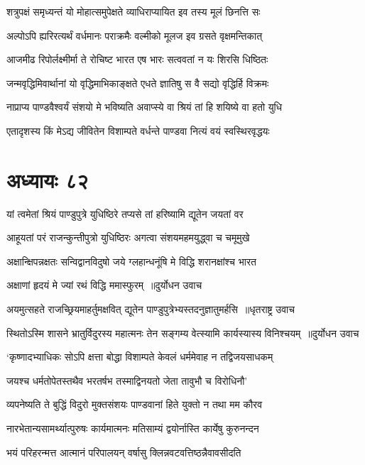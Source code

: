 \twolineshloka
{शत्रुपक्षं समृध्यन्तं यो मोहात्समुपेक्षते}
{व्याधिराप्यायित इव तस्य मूलं छिनत्ति सः}


\twolineshloka
{अल्पोऽपि ह्यरिरत्यर्थं वर्धमानः पराक्रमैः}
{वल्मीको मूलज इव ग्रसते वृक्षमन्तिकात्}


\twolineshloka
{आजमीढ रिपोर्लक्ष्मीर्मा ते रोचिष्ट भारत}
{एष भारः सत्ववतां न यः शिरसि धिष्ठितः}


\twolineshloka
{जन्मवृद्धिमिवार्थानां यो वृद्धिमाभिकाङ्क्षते}
{एधते ज्ञातिषु स वै सद्यो वृद्धिर्हि विक्रमः}


\twolineshloka
{नाप्राप्य पाण्डवैश्वर्यं संशयो मे भविष्यति}
{अवाप्स्ये वा श्रियं तां हि शयिष्ये वा हतो युधि}


\twolineshloka
{एतादृशस्य किं मेऽद्य जीवितेन विशाम्पते}
{वर्धन्ते पाण्डवा नित्यं वयं स्वस्थिरवृद्धयः}


\chapter{अध्यायः ८२}
\twolineshloka
{यां त्वमेतां श्रियं पाण्डुपुत्रे युधिष्ठिरे}
{तप्यसे तां हरिष्यामि द्यूतेन जयतां वर}


\twolineshloka
{आहूयतां परं राजन्कुन्तीपुत्रो युधिष्ठिरः}
{अगत्वा संशयमहमयुद्ध्वा च चमूमुखे}


\twolineshloka
{अक्षान्क्षिपन्नक्षतः सन्विद्वानविदुषो जये}
{ग्लहान्धनूंषि मे विद्धि शरानक्षांश्च भारत}


\twolineshloka
{अक्षाणां हृदयं मे ज्यां रथं विद्धि ममास्फुरम् ॥दुर्योधन उवाच}
{}


\threelineshloka
{अयमुत्सहते राजच्छ्रियमाहर्तुमक्षवित्}
{द्यूतेन पाण्डुपुत्रेभ्यस्तदनुज्ञातुमर्हसि ॥धृतराष्ट्र उवाच}
{}


\twolineshloka
{स्थितोऽस्मि शासने भ्रातुर्विदुरस्य महात्मनः}
{तेन सङ्गम्य वेत्स्यामि कार्यस्यास्य विनिश्चयम् ॥दुर्योधन उवाच}


\twolineshloka
{`कृष्णादभ्याधिकः सोऽपि क्षत्ता बोद्धा विशाम्पते}
{केवलं धर्ममेवाह न तद्विजयसाधकम्}


\twolineshloka
{जयश्च धर्मतोपेतस्तथैव भरतर्षभ}
{तस्माद्विनयतो जेता तावुभौ च विरोधिनौ'}


\twolineshloka
{व्यपनेष्यति ते बुद्धिं विदुरो मुक्तसंशयः}
{पाण्डवानां हिते युक्तो न तथा मम कौरव}


\twolineshloka
{नारभेतान्यसामर्थ्यात्पुरुषः कार्यमात्मनः}
{मतिसाम्यं द्वयोर्नास्ति कार्येषु कुरुनन्दन}


\twolineshloka
{भयं परिहरन्मत्त आत्मानं परिपालयन्}
{वर्षासु क्लिन्नवटवत्तिष्ठन्नैवावसीदति}


